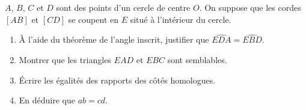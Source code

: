 \documentclass[main.tex]{subfiles}
\begin{document}
\begin{exercise}
{   
}\hfill
\parbox{0.6\linewidth}{
$A$, $B$, $C$ et $D$ sont des points d'un cercle de centre $O$. On suppose que les cordes $[AB]$ et $[CD]$ se coupent en $E$ situé à l'intérieur du cercle.
\begin{enumerate}[label=\alph*), leftmargin=*]
	\item À l'aide du théorème de l'angle inscrit, justifier que $\widehat{EDA}=\widehat{EBD}$.
	\item Montrer que les triangles $EAD$ et $EBC$ sont semblables.
	\item Écrire les égalités des rapports des côtés homologues.
	\item En déduire que $ab=cd$.
\end{enumerate}
}
\end{exercise}

%	 
 
\end{document}
